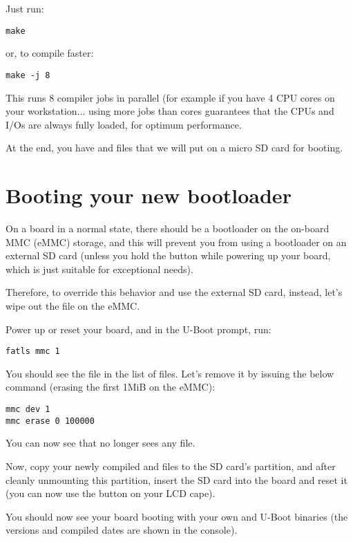 Just run:
\begin{verbatim}
make
\end{verbatim}

or, to compile faster:

\begin{verbatim}
make -j 8
\end{verbatim}

This runs 8 compiler jobs in parallel (for example if you have 4 CPU
cores on your workstation... using more jobs than cores guarantees that
the CPUs and I/Os are always fully loaded, for optimum performance.

At the end, you have  and  files that we will
put on a micro SD card for booting.



\section{Booting your new bootloader}

On a board in a normal state, there should be a bootloader on the on-board MMC
(eMMC) storage, and this will prevent you from using a bootloader on an
external SD card (unless you hold the  button while powering
up your board, which is just suitable for exceptional needs).

Therefore, to override this behavior and use the external SD card,
instead, let's wipe out the  file on the eMMC.

Power up or reset your board, and in the U-Boot prompt, run:

\begin{verbatim}
fatls mmc 1
\end{verbatim}

You should see the  file in the list of files. Let's remove it
by issuing the below command (erasing the first 1MiB on the eMMC):

\begin{verbatim}
mmc dev 1
mmc erase 0 100000
\end{verbatim}

You can now see that  no longer sees any file.

Now, copy your newly compiled  and  files to
the SD card's  partition, and after cleanly unmounting this
partition, insert the SD card into the board and reset it (you can now
use the  button on your LCD cape).

You should now see your board booting with your own  and U-Boot
binaries (the versions and compiled dates are shown in the console).

